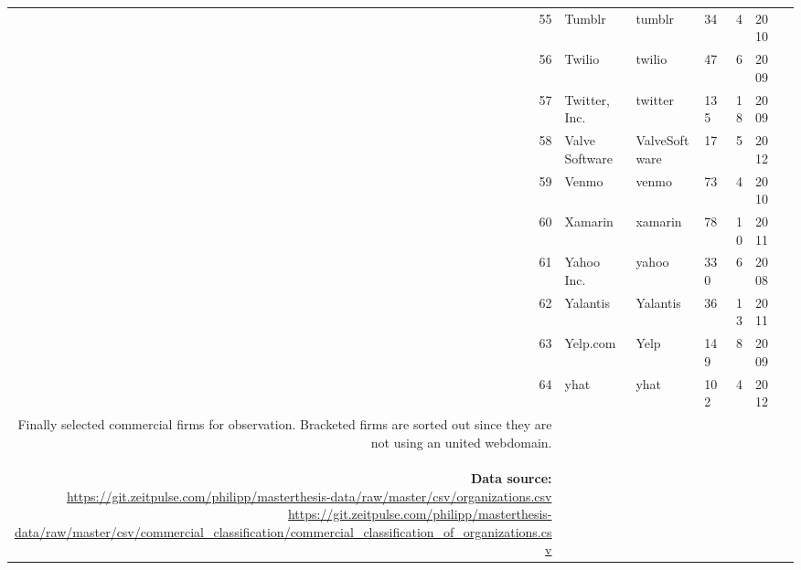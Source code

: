 \begin{longtable}{rlllrlr}
  55 & Tumblr & tumblr &  34 &   4 & 2010 \\
  56 & Twilio & twilio &  47 &   6 & 2009 \\
  57 & Twitter, Inc. & twitter & 135 &  18 & 2009 \\
  58 & Valve Software & ValveSoftware &  17 &   5 & 2012 \\
  59 & Venmo & venmo &  73 &   4 & 2010 \\
  60 & Xamarin & xamarin &  78 &  10 & 2011 \\
  61 & Yahoo Inc. & yahoo & 330 &   6 & 2008 \\
  62 & Yalantis & Yalantis &  36 &  13 & 2011 \\
  63 & Yelp.com & Yelp & 149 &   8 & 2009 \\
  64 & yhat & yhat & 102 &   4 & 2012 \\
   \hline

   \caption{Finally selected commercial firms for observation. Bracketed firms are sorted out since they are not using an united webdomain. \\ \\
   \textbf{Data source:} \\
   \tiny
   \url{https://git.zeitpulse.com/philipp/masterthesis-data/raw/master/csv/organizations.csv} \\
   \url{https://git.zeitpulse.com/philipp/masterthesis-data/raw/master/csv/commercial_classification/commercial_classification_of_organizations.csv}
   }
   \label{tbl:selected_commercial_firms}

 \end{longtable}

